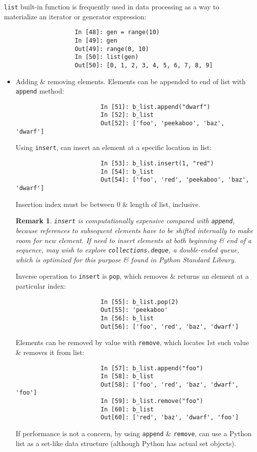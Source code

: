 \documentclass{article}
\newtheorem{remark}{Remark}
\begin{document}
\begin{enumerate}
\begin{itemize}
\begin{itemize}
\begin{itemize}
				{\tt list} built-in function is frequently used in data processing as a way to materialize an iterator or generator expression:
				\begin{verbatim}
					In [48]: gen = range(10)
					In [49]: gen
					Out[49]: range(0, 10)
					In [50]: list(gen)
					Out[50]: [0, 1, 2, 3, 4, 5, 6, 7, 8, 9]
				\end{verbatim}
				\begin{itemize}
					\item {\sf Adding \& removing elements.} Elements can be appended to end of list with {\tt append} method:
					\begin{verbatim}
						In [51]: b_list.append("dwarf")
						In [52]: b_list
						Out[52]: ['foo', 'peekaboo', 'baz', 'dwarf']
					\end{verbatim}
					Using {\tt insert}, can insert an element at a specific location in list:
					\begin{verbatim}
						In [53]: b_list.insert(1, "red")
						In [54]: b_list
						Out[54]: ['foo', 'red', 'peekaboo', 'baz', 'dwarf']
					\end{verbatim}
					Insertion index must be between 0 \& length of list, inclusive.					
					\begin{remark}
						{\tt insert} is computationally expensive compared with {\tt append}, because references to subsequent elements have to be shifted internally to make room for new element. If need to insert elements at both beginning \& end of a sequence, may wish to explore {\tt collections.deque}, a double-ended queue, which is optimized for this purpose \& found in Python Standard Library.
					\end{remark}
					Inverse operation to {\tt insert} is {\tt pop}, which removes \& returns an element at a particular index:
					\begin{verbatim}
						In [55]: b_list.pop(2)
						Out[55]: 'peekaboo'
						In [56]: b_list
						Out[56]: ['foo', 'red', 'baz', 'dwarf']
					\end{verbatim}
					Elements can be removed by value with {\tt remove}, which locates 1st such value \& removes it from list:
					\begin{verbatim}
						In [57]: b_list.append("foo")
						In [58]: b_list
						Out[58]: ['foo', 'red', 'baz', 'dwarf', 'foo']
						In [59]: b_list.remove("foo")
						In [60]: b_list
						Out[60]: ['red', 'baz', 'dwarf', 'foo']
					\end{verbatim}
					If performance is not a concern, by using {\tt append} \& {\tt remove}, can use a Python list as a set-like data structure (although Python has actual set objects).
					

\end{itemize}
\end{itemize}
\end{itemize}
\end{itemize}
\end{enumerate}
\end{document}

